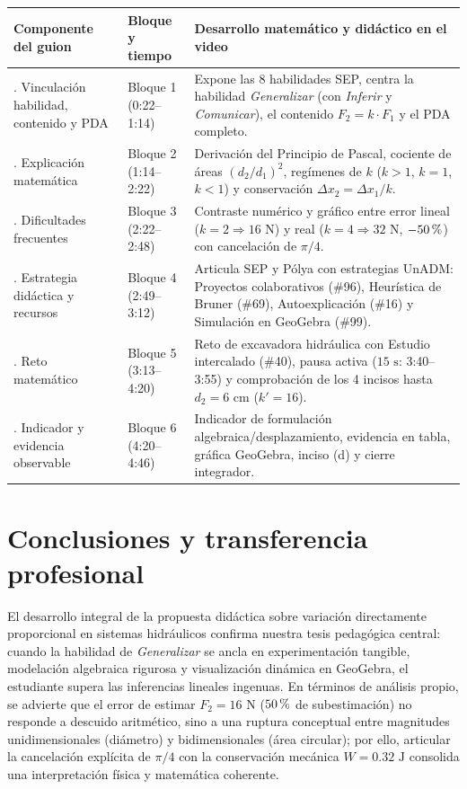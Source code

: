 \documentclass[spanish,letterpaper,oneside]{article}
\begin{document}
{\small{}\renewcommand{\arraystretch}{1.14}
\noindent\begin{tabularx}{\textwidth}{|>{\raggedright\arraybackslash}p{}|>{\centering\arraybackslash}p{}|>{\raggedright\arraybackslash}X|}\hline
\rowcolor{iiiepePale} \textbf{Componente del guion} & \textbf{Bloque y tiempo} & \textbf{Desarrollo matemático y didáctico en el video} \\\hline
1. Vinculación habilidad, contenido y PDA & Bloque 1 (0:22--1:14) & Expone las 8 habilidades SEP, centra la habilidad \textit{Generalizar} (con \textit{Inferir} y \textit{Comunicar}), el contenido $F_2=k\cdot F_1$ y el PDA completo. \\\hline
2. Explicación matemática & Bloque 2 (1:14--2:22) & Derivación del Principio de Pascal, cociente de áreas $(d_2/d_1)^2$, regímenes de $k$ ($k>1$, $k=1$, $k<1$) y conservación $\Delta x_2=\Delta x_1/k$. \\\hline
3. Dificultades frecuentes & Bloque 3 (2:22--2:48) & Contraste numérico y gráfico entre error lineal ($k=2 \Rightarrow 16\text{ N}$) y real ($k=4 \Rightarrow 32\text{ N}$, $-50\,\text{\symbol{37}}$) con cancelación de $\pi/4$. \\\hline
4. Estrategia didáctica y recursos & Bloque 4 (2:49--3:12) & Articula SEP y Pólya con estrategias UnADM: Proyectos colaborativos (\#96), Heurística de Bruner (\#69), Autoexplicación (\#16) y Simulación en GeoGebra (\#99). \\\hline
5. Reto matemático & Bloque 5 (3:13--4:20) & Reto de excavadora hidráulica con Estudio intercalado (\#40), pausa activa ($15\text{ s}$: 3:40--3:55) y comprobación de los 4 incisos hasta $d_2=6\text{ cm}$ ($k'=16$). \\\hline
6. Indicador y evidencia observable & Bloque 6 (4:20--4:46) & Indicador de formulación algebraica/desplazamiento, evidencia en tabla, gráfica GeoGebra, inciso (d) y cierre integrador. \\\hline
\end{tabularx}}
\vspace{4pt}

\clearpage
\section{Conclusiones y transferencia profesional}
El desarrollo integral de la propuesta didáctica sobre variación directamente proporcional en sistemas hidráulicos confirma nuestra tesis pedagógica central: cuando la habilidad de \textit{Generalizar} se ancla en experimentación tangible, modelación algebraica rigurosa y visualización dinámica en GeoGebra, el estudiante supera las inferencias lineales ingenuas. En términos de análisis propio, se advierte que el error de estimar $F_2 = 16\text{ N}$ ($50\,\text{\symbol{37}}$ de subestimación) no responde a descuido aritmético, sino a una ruptura conceptual entre magnitudes unidimensionales (diámetro) y bidimensionales (área circular); por ello, articular la cancelación explícita de $\pi/4$ con la conservación mecánica $W = 0.32\text{ J}$ consolida una interpretación física y matemática coherente.
\end{document}
